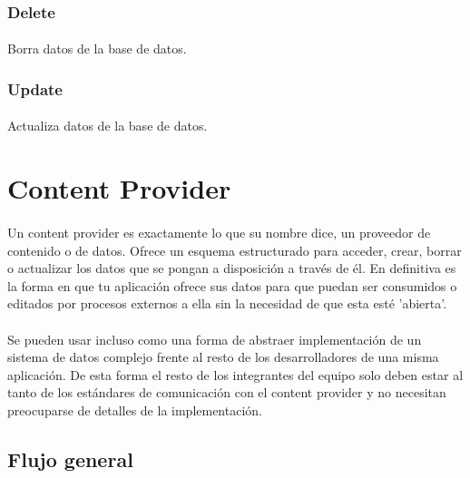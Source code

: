 \documentclass[10pt]{extarticle}
\begin{document}
\subsubsection{Delete}
\paragraph{}
Borra datos de la base de datos.

\subsubsection{Update}
\paragraph{}
Actualiza datos de la base de datos.


\section{Content Provider}

\paragraph{}
Un content provider es exactamente lo que su nombre dice, un proveedor de contenido o de datos. Ofrece un esquema estructurado para acceder, crear, borrar o actualizar los datos que se pongan a disposición a través de él. En definitiva es la forma en que tu aplicación ofrece sus datos para que puedan ser consumidos o editados por procesos externos a ella sin la necesidad de que esta esté 'abierta'.

\paragraph{}
Se pueden usar incluso como una forma de abstraer implementación de un sistema de datos complejo frente al resto de los desarrolladores de una misma aplicación. De esta forma el resto de los integrantes del equipo solo deben estar al tanto de los estándares de comunicación con el content provider y no necesitan preocuparse de detalles de la implementación. 

\subsection{Flujo general}
\end{document}
